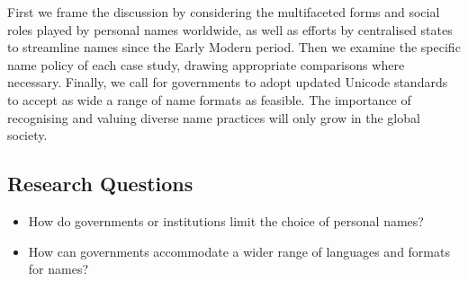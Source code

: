 First we frame the discussion by considering the multifaceted forms and social
roles played by personal names worldwide, as well as efforts by centralised
states to streamline names since the Early Modern period. Then we examine the
specific name policy of each case study, drawing appropriate comparisons where
necessary. Finally, we call for governments to adopt updated Unicode standards
to accept as wide a range of name formats as feasible. The importance of
recognising and valuing diverse name practices will only grow in the global
society.

\subsection{Research Questions}

\begin{itemize}
\item How do governments or institutions limit the choice of personal names?
\item How can governments accommodate a wider range of languages and formats for
	names?
\end{itemize}

